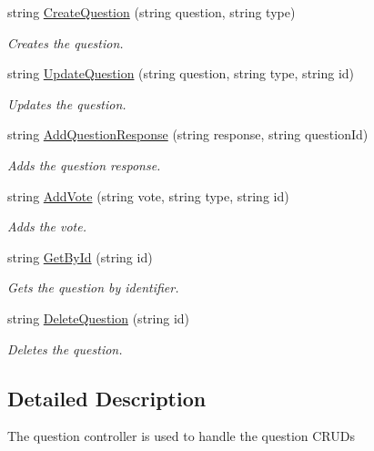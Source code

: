 \begin{DoxyCompactItemize}
string \hyperlink{class_wis_r_rest_a_p_i_1_1_controllers_1_1_question_controller_a4e553fb1e4040e703ff4cefa46da6bd2}{Create\+Question} (string question, string type)
\begin{DoxyCompactList}\small\item\em Creates the question. \end{DoxyCompactList}\item 
string \hyperlink{class_wis_r_rest_a_p_i_1_1_controllers_1_1_question_controller_ac1332265d75ba4f66bb550e1518e376a}{Update\+Question} (string question, string type, string id)
\begin{DoxyCompactList}\small\item\em Updates the question. \end{DoxyCompactList}\item 
string \hyperlink{class_wis_r_rest_a_p_i_1_1_controllers_1_1_question_controller_ad6b9d79b93fc80432671e9930c394e45}{Add\+Question\+Response} (string response, string question\+Id)
\begin{DoxyCompactList}\small\item\em Adds the question response. \end{DoxyCompactList}\item 
string \hyperlink{class_wis_r_rest_a_p_i_1_1_controllers_1_1_question_controller_aad873552a4b0152687297c20c0daa9f0}{Add\+Vote} (string vote, string type, string id)
\begin{DoxyCompactList}\small\item\em Adds the vote. \end{DoxyCompactList}\item 
string \hyperlink{class_wis_r_rest_a_p_i_1_1_controllers_1_1_question_controller_a69d471ec8ea120bc5f499a87531e4695}{Get\+By\+Id} (string id)
\begin{DoxyCompactList}\small\item\em Gets the question by identifier. \end{DoxyCompactList}\item 
string \hyperlink{class_wis_r_rest_a_p_i_1_1_controllers_1_1_question_controller_ae1f099aeee3398760a719c767b4f7b6b}{Delete\+Question} (string id)
\begin{DoxyCompactList}\small\item\em Deletes the question. \end{DoxyCompactList}\end{DoxyCompactItemize}


\subsection{Detailed Description}
The question controller is used to handle the question C\+R\+U\+D\textquotesingle{}s 



